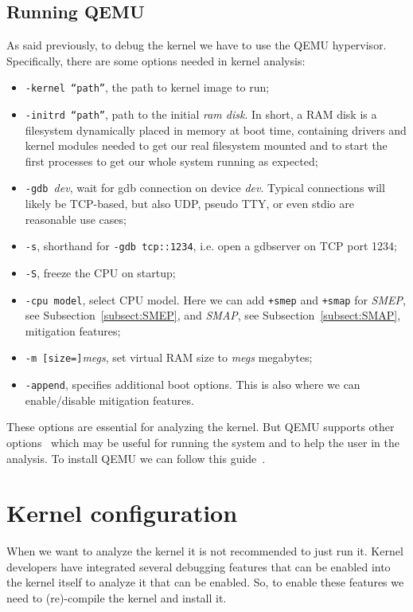 \documentclass{masterthesis}
\newcommand{\refToSubSection}[1]{Subsection~\ref{subsect:#1}\xspace}
\begin{document}
\subsection{Running QEMU}
\label{subsect:QEMU}
As said previously, to debug the kernel we have to use the QEMU hypervisor. Specifically, there are some options needed in kernel analysis:
\begin{itemize}
\item \texttt{-kernel  ``path''}, the path to kernel image to run;
\item \texttt{-initrd ``path''}, path to the initial \emph{ram disk}. In short, a RAM disk is a filesystem dynamically placed in memory at boot time, containing drivers and kernel modules needed to get our real filesystem mounted and to start the first processes to get our whole system running as expected;
\item \texttt{-gdb }\textit{dev}, wait for gdb connection on device \textit{dev}. Typical connections will likely be TCP-based, but also UDP, pseudo TTY, or even stdio are reasonable use cases;
\item \texttt{-s}, shorthand for \texttt{-gdb tcp::1234}, i.e. open a gdbserver on TCP port 1234;
\item \texttt{-S}, freeze the CPU on startup;
\item \texttt{-cpu model}, select CPU model. Here we can add \texttt{+smep} and \texttt{+smap} for \emph{SMEP}, see \refToSubSection{SMEP}, and \emph{SMAP}, see \refToSubSection{SMAP}, mitigation features;
\item \texttt{-m [size=]}\textit{megs}, set virtual RAM size to \textit{megs} megabytes;
\item \texttt{-append}, specifies additional boot options. This is also where we can enable/disable mitigation features.
\end{itemize}
These options are essential for analyzing the kernel. But QEMU supports other options~\cite{qemuoption} which may be useful for running the system and to help the user in the analysis.
To install QEMU we can follow this guide~\cite{qemuinstall}. 
\section{Kernel configuration}
\label{sect:configuration}
When we want to analyze the kernel it is not recommended to just run it. Kernel developers have integrated several debugging features that can be enabled into the kernel itself to analyze it that can be enabled.
So, to enable these features we need to (re)-compile the kernel and install it.
\end{document}
